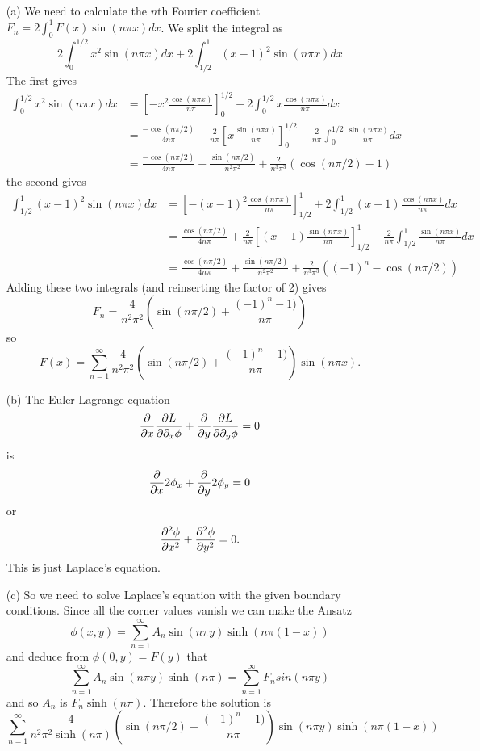 \documentclass[12pt]{article}
\begin{document}
\begin{answer}
\begin{enumerate}
\item[(a)] We need to calculate the $n$th Fourier coefficient $F_n=2\int_0^1F(x)\sin(n\pi x)dx$. We split the integral as
\[2\int_0^{1/2}x^2\sin(n\pi x)dx+2\int_{1/2}^1(x-1)^2\sin(n\pi x)dx\]
The first gives
\begin{align*}
\int_0^{1/2}x^2\sin(n\pi x)dx&=\left[-x^2\frac{\cos(n\pi x)}{n\pi}\right]_0^{1/2}+2\int_0^{1/2}x\frac{\cos(n\pi x)}{n\pi}dx\\
                            &=\frac{-\cos(n\pi/2)}{4n\pi}+\frac{2}{n\pi}\left[x\frac{\sin(n\pi x)}{n\pi}\right]_0^{1/2}-\frac{2}{n\pi}\int_0^{1/2}\frac{\sin(n\pi x)}{n\pi}dx\\
                            &=\frac{-\cos(n\pi/2)}{4n\pi}+\frac{\sin(n\pi/2)}{n^2\pi^2}+\frac{2}{n^3\pi^3}\left(\cos(n\pi/2)-1\right)
\end{align*}
the second gives
\begin{align*}
\int_{1/2}^1(x-1)^2\sin(n\pi x)dx&=\left[-(x-1)^2\frac{\cos(n\pi x)}{n\pi}\right]_{1/2}^1+2\int_{1/2}^1(x-1)\frac{\cos(n\pi x)}{n\pi}dx\\
                            &=\frac{\cos(n\pi/2)}{4n\pi}+\frac{2}{n\pi}\left[(x-1)\frac{\sin(n\pi x)}{n\pi}\right]_{1/2}^1-\frac{2}{n\pi}\int_{1/2}^1\frac{\sin(n\pi x)}{n\pi}dx\\
                            &=\frac{\cos(n\pi/2)}{4n\pi}+\frac{\sin(n\pi/2)}{n^2\pi^2}+\frac{2}{n^3\pi^3}\left((-1)^n-\cos(n\pi/2)\right)
\end{align*}
Adding these two integrals (and reinserting the factor of 2) gives
\[F_n=\frac{4}{n^2\pi^2}\left(\sin(n\pi/2)+\frac{(-1)^n-1)}{n\pi}\right)\]
so
\[F(x)=\sum_{n=1}^{\infty}\frac{4}{n^2\pi^2}\left(\sin(n\pi/2)+\frac{(-1)^n-1)}{n\pi}\right)\sin(n\pi x).\]
\item[(b)] The Euler-Lagrange equation
\[\dfrac{\partial }{\partial x}\dfrac{\partial L}{\partial \partial_x\phi}+\dfrac{\partial }{\partial y}\dfrac{\partial L}{\partial \partial_y\phi}=0\]
is
\[\dfrac{\partial }{\partial x}2\phi_x+\dfrac{\partial }{\partial y}2\phi_y=0\]
or
\[\dfrac{\partial^2 \phi}{\partial x^2}+\dfrac{\partial^2 \phi}{\partial y^2}=0.\]
This is just Laplace's equation.
\item[(c)] So we need to solve Laplace's equation with the given boundary conditions. Since all the corner values vanish we can make the Ansatz
\[\phi(x,y)=\sum_{n=1}^{\infty}A_n\sin(n\pi y)\sinh(n\pi(1-x))\]
and deduce from $\phi(0,y)=F(y)$ that
\[\sum_{n=1}^{\infty}A_n\sin(n\pi y)\sinh(n\pi)=\sum_{n=1}^{\infty}F_nsin(n\pi y)\]
and so $A_n$ is $F_n\sinh(n\pi)$. Therefore the solution is
\[\sum_{n=1}^{\infty}\frac{4}{n^2\pi^2\sinh(n\pi)}\left(\sin(n\pi/2)+\frac{(-1)^n-1)}{n\pi}\right)\sin(n\pi y)\sinh(n\pi(1-x))\]
\end{enumerate}
\end{answer}
\newpage
\end{document}
